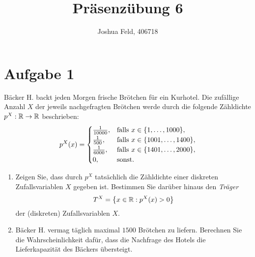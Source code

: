\documentclass{exercise}
\institute{Institut für Statistik und Wirtschaftsmathematik}
\title{Präsenzübung 6}
\author{Joshua Feld, 406718}
\begin{document}
    \maketitle


    \section*{Aufgabe 1}

    \begin{problem}
        Bäcker H. backt jeden Morgen frische Brötchen für ein Kurhotel.
        Die zufällige Anzahl \(X\) der jeweils nachgefragten Brötchen werde durch die folgende Zähldichte \(p^X: \mathbb{R} \to \mathbb{R}\) beschrieben:
        \[
            p^X\parentheses*{x} = \begin{cases}
                \frac{1}{10000}, & \text{falls }x \in \braces*{1, \ldots, 1000},\\
                \frac{1}{500}, & \text{falls }x \in \braces*{1001, \ldots, 1400},\\
                \frac{1}{6000}, & \text{falls }x \in \braces*{1401, \ldots, 2000},\\
                0, & \text{sonst}.
            \end{cases}
        \]
        \begin{enumerate}
            \item Zeigen Sie, dass durch \(p^X\) tatsächlich die Zähldichte einer diskreten Zufallsvariablen \(X\) gegeben ist.
            Bestimmen Sie darüber hinaus den \emph{Träger}
            \[
                T^X = \braces*{x \in \R : p^X\parentheses*{x} > 0}
            \]
            der (diskreten) Zufallsvariablen \(X\).
            \item Bäcker H. vermag täglich maximal \(1500\) Brötchen zu liefern.
            Berechnen Sie die Wahrscheinlichkeit dafür, dass die Nachfrage des Hotels die Lieferkapazität des Bäckers übersteigt.
        \end{enumerate}
    \end{problem}
\end{document}

